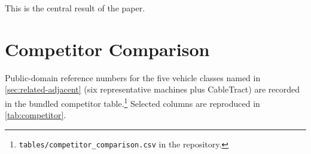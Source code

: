 \documentclass[11pt,a4paper]{article}
\begin{document}
This is the central result of the paper.

\section{Competitor Comparison}\label{sec:competitor}

Public-domain reference numbers for the five vehicle classes named in \cref{sec:related-adjacent} (six representative machines plus CableTract) are recorded in the bundled competitor table.\footnote{\texttt{tables/competitor\_comparison.csv} in the repository.} Selected columns are reproduced in \cref{tab:competitor}.

\begin{table}[H]
\centering\small
\caption{Competitor comparison table. CableTract sits in a unique cell: the only architecture that supports (light/medium) primary tillage, is off-grid capable, and has a short discounted payback. Payback is the replacement-frame value at the \SI{25}{\hectare\per\year} reference (\SI{1.3}{\year}; below one year at $\geq\SI{50}{\hectare\per\year}$); competitor paybacks are manufacturer/press figures at their own scenarios. \emph{Energy/ha} is delivered electrical energy for every row except the diesel tractor, whose \SI{120}{\kWh\per\hectare} is fuel (primary) energy from $12\,\si{\litre\per\hectare}$ at ${\approx}\SI{10}{\kWh\per\litre}$; on a useful-work basis the diesel figure is ${\approx}\SI{36}{\kWh\per\hectare}$ (\cref{sec:r-c2}).}\label{tab:competitor}
\end{table}
\end{document}
